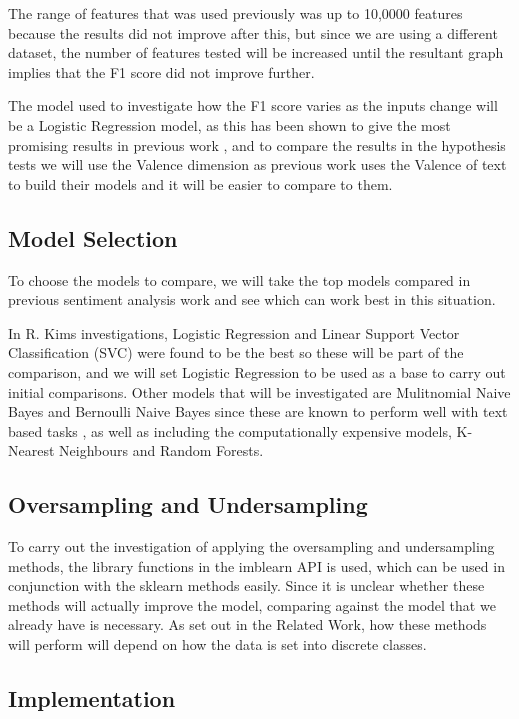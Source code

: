 The range of features that was used previously was up to 10,0000 features because the results did not improve after this, but since we are using a different dataset, the number of features tested will be increased until the resultant graph implies that the F1 score did not improve further.

The model used to investigate how the F1 score varies as the inputs change will be a Logistic Regression model, as this has been shown to give the most promising results in previous work \cite{towardsDS}, and to compare the results in the hypothesis tests we will use the Valence dimension as previous work uses the Valence of text to build their models and it will be easier to compare to them.

\subsection{Model Selection}

To choose the models to compare, we will take the top models compared in previous sentiment analysis work and see which can work best in this situation. 

In R. Kims investigations, Logistic Regression and Linear Support Vector Classification (SVC) were found to be the best so these will be part of the comparison, and we will set Logistic Regression to be used as a base to carry out initial comparisons. 
Other models that will be investigated are Mulitnomial Naive Bayes and Bernoulli Naive Bayes since these are known to perform well with text based tasks \cite{socher2013recursive}, as well as including the computationally expensive models, K-Nearest Neighbours and Random Forests. 

\subsection{Oversampling and Undersampling}

To carry out the investigation of applying the oversampling and undersampling methods, the library functions in the imblearn API is used, which can be used in conjunction with the sklearn methods easily.
Since it is unclear whether these methods will actually improve the model, comparing against the model that we already have is necessary. As set out in the Related Work, how these methods will perform will depend on how the data is set into discrete classes.

\subsection{Implementation}

